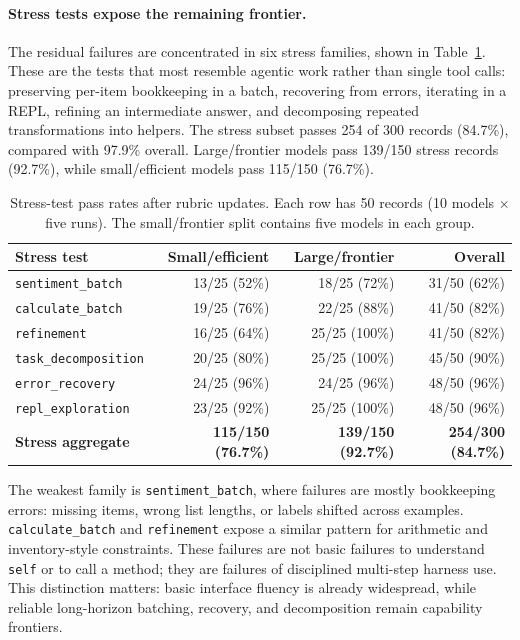 \documentclass[11pt, logo, onecolumn, copyright, colorlinks=true, allcolors=blue]{nvidiatechreport}
\begin{document}
\paragraph{Stress tests expose the remaining frontier.}
The residual failures are concentrated in six stress families, shown in
Table~\ref{tab:captests-stress}. These are the tests that most resemble
agentic work rather than single tool calls: preserving per-item bookkeeping in a
batch, recovering from errors, iterating in a REPL, refining an intermediate
answer, and decomposing repeated transformations into helpers. The stress subset
passes 254 of 300 records (84.7\%), compared with 97.9\% overall. Large/frontier
models pass 139/150 stress records (92.7\%), while small/efficient models pass
115/150 (76.7\%).

\begin{table}[t]
\centering
\caption{Stress-test pass rates after rubric updates. Each row has 50 records
(10 models $\times$ five runs). The small/frontier split contains five models in
each group.}
\label{tab:captests-stress}
\small
\begin{tabular}{lrrr}
\toprule
\textbf{Stress test} & \textbf{Small/efficient} & \textbf{Large/frontier} & \textbf{Overall} \\
\midrule
\texttt{sentiment\_batch} & 13/25 (52\%) & 18/25 (72\%) & 31/50 (62\%) \\
\texttt{calculate\_batch} & 19/25 (76\%) & 22/25 (88\%) & 41/50 (82\%) \\
\texttt{refinement} & 16/25 (64\%) & 25/25 (100\%) & 41/50 (82\%) \\
\texttt{task\_decomposition} & 20/25 (80\%) & 25/25 (100\%) & 45/50 (90\%) \\
\texttt{error\_recovery} & 24/25 (96\%) & 24/25 (96\%) & 48/50 (96\%) \\
\texttt{repl\_exploration} & 23/25 (92\%) & 25/25 (100\%) & 48/50 (96\%) \\
\midrule
\textbf{Stress aggregate} & \textbf{115/150 (76.7\%)} & \textbf{139/150 (92.7\%)} & \textbf{254/300 (84.7\%)} \\
\bottomrule
\end{tabular}
\end{table}

The weakest family is \texttt{sentiment\_batch}, where failures are mostly
bookkeeping errors: missing items, wrong list lengths, or labels shifted across
examples. \texttt{calculate\_batch} and \texttt{refinement} expose a similar
pattern for arithmetic and inventory-style constraints. These failures are not
basic failures to understand \texttt{self} or to call a method; they are failures
of disciplined multi-step harness use. This distinction matters: basic interface
fluency is already widespread, while reliable long-horizon batching, recovery,
and decomposition remain capability frontiers.
\end{document}
